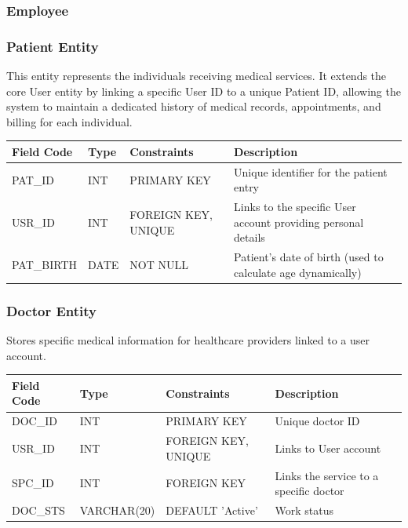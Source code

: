 \subsubsection{Employee}

\subsubsection{Patient Entity}
This entity represents the individuals receiving medical services. It extends the core User entity by linking a specific User ID to a unique Patient ID, allowing the system to maintain a dedicated history of medical records, appointments, and billing for each individual.
\begin{table}[H]
	\centering
	\small
	\renewcommand{\arraystretch}{1.4}
	\begin{tabularx}{\textwidth}{l l l X}
		\toprule
		\rowcolor[gray]{0.9} \textbf{Field Code} & \textbf{Type} & \textbf{Constraints} & \textbf{Description} \\
		\midrule
		PAT\_ID & INT & PRIMARY KEY & Unique identifier for the patient entry \\
		USR\_ID & INT & FOREIGN KEY, UNIQUE & Links to the specific User account providing personal details \\
		PAT\_BIRTH & DATE     & NOT NULL                     & Patient's date of birth (used to calculate age dynamically) \\
		\bottomrule
	\end{tabularx}
\end{table}

\subsubsection{Doctor Entity}
Stores specific medical information for healthcare providers linked to a user account.
\begin{table}[H]
	\centering
	\small
	\renewcommand{\arraystretch}{1.3}
	\begin{tabularx}{\textwidth}{l l l X}
		\toprule
		\rowcolor[gray]{0.9} \textbf{Field Code} & \textbf{Type} & \textbf{Constraints} & \textbf{Description} \\
		\midrule
		DOC\_ID & INT & PRIMARY KEY & Unique doctor ID \\
		USR\_ID & INT & FOREIGN KEY, UNIQUE & Links to User account \\
		SPC\_ID & INT & FOREIGN KEY & Links the service to a specific doctor \\
		DOC\_STS & VARCHAR(20) & DEFAULT 'Active' & Work status \\
		\bottomrule
	\end{tabularx}
\end{table}
